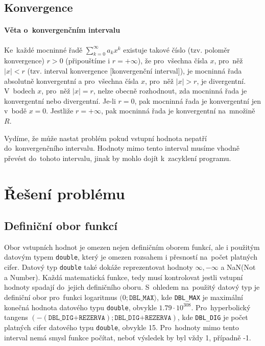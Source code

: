 \documentclass[12pt,a4paper,titlepage,final]{article}
\begin{document}
\subsection{Konvergence}

\paragraph*{Věta o~konvergenčním intervalu \cite{konver}\\}
Ke~každé mocninné řadě $\sum\limits_{k=0}^\infty a_{k}x^{k}$ existuje takové číslo (tzv. poloměr
konvergence) $r>0$ (připouštíme i $r = +\infty$), že pro~všechna čísla $x$, pro~něž
$|x| < r$ (tzv. interval konvergence [konvergenční interval]), je mocninná řada
absolutně konvergentní a pro~všechna čísla $x$, pro~něž $|x| > r$, je divergentní.
V~bodech $x$, pro~něž $|x|=r$, nelze obecně rozhodnout, zda mocninná řada je
konvergentní nebo divergentní. Je-li $r = 0$, pak mocninná řada je konvergentní
jen v~bodě $x = 0$. Jestliže $r = + \infty$, pak mocninná řada je konvergentní
na~množině $R$.

Vydíme, že může nastat problém pokud vstupní hodnota nepatří do~konvergenčního
intervalu. Hodnoty mimo tento interval musíme vhodně převést do~tohoto intervalu,
jinak by mohlo dojít k~zacyklení programu.

\section{Řešení problému} \label{reseni}
\subsection{Definiční obor funkcí}\label{rozsah}

Obor vstupních hodnot je omezen nejen definičním oborem funkcí, ale i 
použitým datovým typem \texttt{double}, který je omezen rozsahem i 
přesností na~počet platných cifer. Datový typ \texttt{double} 
také dokáže reprezentovat hodnoty $\infty, -\infty$ a NaN(Not a Number).
Každá matematická funkce, tedy musí kontrolovat jestli vstupní hodnoty spadají
do~jejich definičního oboru. S~ohledem na~použitý datový typ je definiční obor
pro~funkci logaritmus $(0;\texttt{DBL\_MAX}\rangle$, kde \texttt{DBL\_MAX} je
maximální konečná hodnota datového typu \texttt{double}, obvykle $1.79\cdot10^{308}$. Pro~hyperbolický tangens
$\left(-(\texttt{DBL\_DIG+REZERVA});\texttt{DBL\_DIG+REZERVA} \right)$, kde \texttt{DBL\_DIG} je počet
platných cifer datového typu \texttt{double}, obvykle 15. Pro~hodnoty mimo tento interval
nemá smysl funkce počítat, neboť výsledek by byl vždy 1, případně -1.
\end{document}
